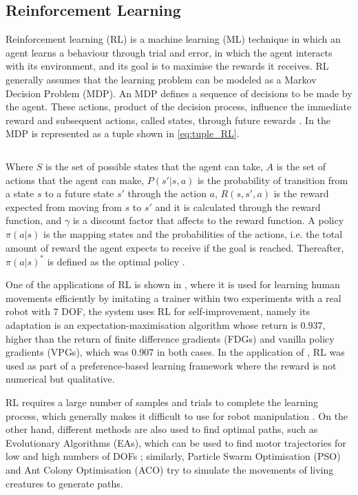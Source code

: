 \documentclass[thesis]{mas_proposal}
\begin{document}
	\subsection{Reinforcement Learning}
		
		Reinforcement learning (RL) is a machine learning (ML) technique in which an agent learns a behaviour through trial and error, in which the agent interacts with its environment, and its goal is to maximise the rewards it receives. RL generally assumes that the learning problem can be modeled as a Markov Decision Problem (MDP). An MDP defines a sequence of decisions to be made by the agent. These actions, product of the decision process, influence the immediate reward and subsequent actions, called states, through future rewards \cite{Kaelbling1996, Brunke2022, Elguea2023}. In \cite{Elguea2023} the MDP is represented as a tuple shown in \ref{eq:tuple_RL}. 
		
		\begin{equation}
			[S, A, P(s'|s, a), R(s, s', a), \gamma]
		\label{eq:tuple_RL}
		\end{equation}
		
		Where $S$ is the set of possible states that the agent can take, $A$ is the set of actions that the agent can make, $P(s'|s, a)$ is the probability of transition from a state $s$ to a future state $s'$ through the action $a$, $R(s, s', a)$ is the reward expected from moving from $s$ to $s'$ and it is calculated through the reward function, and $\gamma$ is a discount factor that affects to the reward function. A policy $\pi(a|s)$ is the mapping states and the probabilities of the actions, i.e. the total amount of reward the agent expects to receive if the goal is reached. Thereafter, $\pi(a|s)^*$ is defined as the optimal policy \cite{Hussein2018, Elguea2023}. 
			
		One of the applications of RL is shown in \cite{Kober2010}, where it is used for learning human movements efficiently by imitating a trainer within two experiments with a real robot with 7 DOF, the system uses RL for self-improvement, namely its adaptation is an expectation-maximisation algorithm whose return is $0.937$, higher than the return of finite difference gradients (FDGs) and vanilla policy gradients (VPGs), which was 0.907 in both cases. In the application of \cite{Fuernkranz2012}, RL was used as part of a preference-based learning framework where the reward is not numerical but qualitative. 
		
		RL requires a large number of samples and trials to complete the learning process, which generally makes it difficult to use for robot manipulation \cite{Hua2021}. On the other hand, different methods are also used to find optimal paths, such as Evolutionary Algorithms (EAs), which can be used to find motor trajectories for low and high numbers of DOFs \cite{Nolfi2000}; similarly, Particle Swarm Optimisation (PSO) \cite{Zhang2015} and Ant Colony Optimisation (ACO) \cite{Zhang2010} try to simulate the movements of living creatures to generate paths.
	
\end{document}
